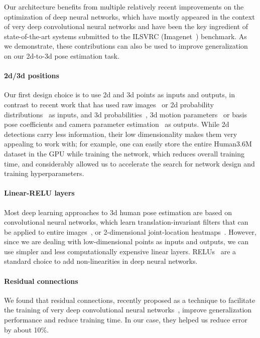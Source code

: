 \documentclass[10pt,twocolumn,letterpaper]{article}
\begin{document}
Our architecture benefits from multiple relatively recent improvements on the optimization of deep neural networks, which have mostly appeared in the context of very deep convolutional neural networks and have been the key ingredient of state-of-the-art systems submitted to the ILSVRC (Imagenet~\cite{imagenet}) benchmark. As we demonstrate, these contributions can also be used to improve generalization on our 2d-to-3d pose estimation task.

\paragraph{2d/3d positions} Our first design choice is to use 2d and 3d points as inputs and outputs, in contrast to recent work that has used raw images~\cite{volumetric,tekin2016structured,zhou2016deep,park20163d,tekin2016direct,ghezelghieh2016learning,du2016marker,li2015maximum,zhou2016sparseness} or 2d probability distributions~\cite{zhou2016sparseness,volumetric} as inputs, and 3d probabilities~\cite{volumetric}, 3d motion parameters~\cite{zhou2016deep} or basis pose coefficients and camera parameter estimation~\cite{Ramakrishna:2012,akhter-and-black,keep-it-simpl,zhou2016sparseness,zhou2016sparse} as outputs. While 2d detections carry less information, their low dimensionality makes them very appealing to work with; for example, one can easily store the entire Human3.6M dataset in the GPU while training the network, which reduces overall training time, and considerably allowed us to accelerate the search for network design and training hyperparameters. 

\paragraph{Linear-RELU layers} Most deep learning approaches to 3d human pose estimation are based on convolutional neural networks, which learn translation-invariant filters that can be applied to entire images~\cite{tekin2016structured,volumetric,park20163d,ghezelghieh2016learning,li2015maximum}, or 2-dimensional joint-location heatmaps~\cite{volumetric, zhou2016sparseness}. However, since we are dealing with low-dimensional points as inputs and outputs, we can use simpler and less computationally expensive linear layers. RELUs~\cite{relu} are a standard choice to add non-linearities in deep neural networks.

\paragraph{Residual connections} We found that residual connections, recently proposed as a technique to facilitate the training of very deep convolutional neural networks~\cite{he2016deep}, improve generalization performance and reduce training time. In our case, they helped us reduce error by about 10\%.
\end{document}
